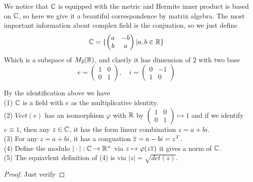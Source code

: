\documentclass[en,geye,blue,pc,12pt]{elegantnote}
\begin{document}
We notice that \(\mathbb{C}\) is equipped with the metric and Hermite inner product is based on \(\mathbb{C}\), so here we give it a beautiful correspondence by matrix algebra. The most important information about complex field is the conjuation, so we just define 
\[\mathbb{C} = \{\begin{pmatrix}
a &-b \\
b &a
\end{pmatrix}| a,b\in \mathbb{R}\}\]
Which is a subspace of \(M_2(\mathbb{R})\), and claerly it has dimension of 2 with two base
\[e = \begin{pmatrix}
  1 &0 \\
  0 &1 
\end{pmatrix}, \quad i = \begin{pmatrix}
  0 &-1\\
  1 &0
\end{pmatrix}\]

\begin{proposition} By the identification above we have
  \\(1) \(\mathbb{C}\) is a field with \(e\) as the multiplicative identity.
  \\(2) \(Vect(e)\) has an isomorphism \(\varphi\) with \(\mathbb{R}\) by \(\begin{pmatrix}
    1 &0 \\
    0 &1
  \end{pmatrix}\mapsto 1\) and if we identify \(e \equiv 1 \), then any \(z \in \mathbb{C}\), it has the form linear combination \(z = a+bi\).
  \\(3) For any \(z=a+bi\), it has a conguation \(\overline{z} = a -bi = z^T\).
  \\(4) Define the modulo \(|\cdot|:\mathbb{C} \to \mathbb{R}^+\) via \(z \mapsto \varphi(z \overline{z}) \) it gives a norm of \(\mathbb{C}\).
  \\(5) The equiavlent definition of (4) is via \(|z| = \sqrt{det(z)}\).
  \begin{proof}
    Just verify
  \end{proof}
\end{proposition}
\end{document}
